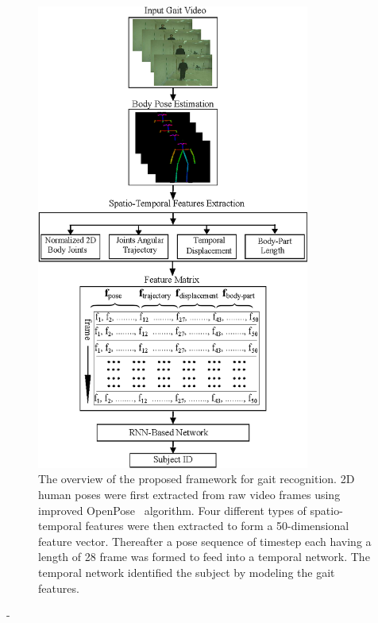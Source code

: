 \begin{figure}
	\centering
	\includegraphics[width=0.8\textwidth]{figures/proposed_method.eps}
	\caption [The overview of the proposed framework for gait recognition] 
	{The overview of the proposed framework for gait recognition. 2D human poses were first extracted from raw video frames using improved OpenPose~\cite{Cao_19} algorithm. Four different types of spatio-temporal features were then extracted to form a 50-dimensional feature vector. Thereafter a pose sequence of timestep each having a length of 28 frame was formed to feed into a temporal network. The temporal network identified the subject by modeling the gait features. \label{fig:overview_proposed_method}
	}	
\end{figure}

-
